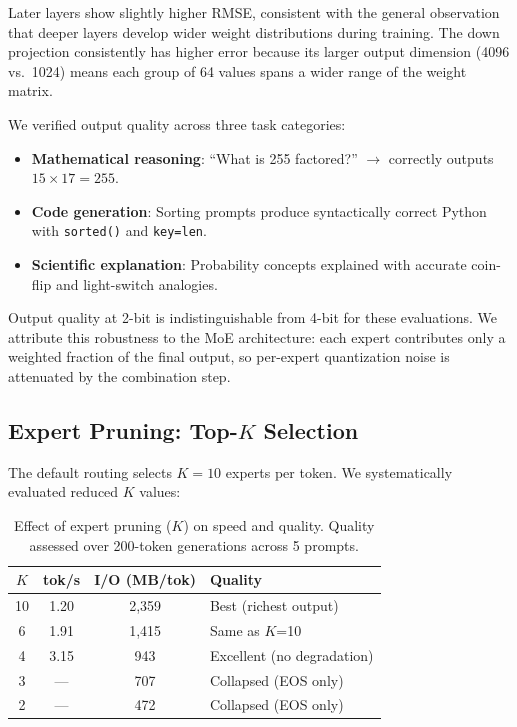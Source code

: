 \documentclass[11pt,twocolumn]{article}
\begin{document}
Later layers show slightly higher RMSE, consistent with the general observation that deeper layers develop wider weight distributions during training.
The down projection consistently has higher error because its larger output dimension (4096 vs.\ 1024) means each group of 64 values spans a wider range of the weight matrix.

We verified output quality across three task categories:
\begin{itemize}[leftmargin=*,itemsep=2pt]
    \item \textbf{Mathematical reasoning}: ``What is 255 factored?'' $\to$ correctly outputs $15 \times 17 = 255$.
    \item \textbf{Code generation}: Sorting prompts produce syntactically correct Python with \texttt{sorted()} and \texttt{key=len}.
    \item \textbf{Scientific explanation}: Probability concepts explained with accurate coin-flip and light-switch analogies.
\end{itemize}

Output quality at 2-bit is indistinguishable from 4-bit for these evaluations.
We attribute this robustness to the MoE architecture: each expert contributes only a weighted fraction of the final output, so per-expert quantization noise is attenuated by the combination step.

\subsection{Expert Pruning: Top-$K$ Selection}

The default routing selects $K=10$ experts per token.
We systematically evaluated reduced $K$ values:

\begin{table}[t]
\centering
\small
\caption{Effect of expert pruning ($K$) on speed and quality. Quality assessed over 200-token generations across 5 prompts.}
\label{tab:pruning}
\begin{tabular}{@{}cccl@{}}
\toprule
$K$ & \textbf{tok/s} & \textbf{I/O (MB/tok)} & \textbf{Quality} \\
\midrule
10 & 1.20 & 2{,}359 & Best (richest output) \\
6 & 1.91 & 1{,}415 & Same as $K$=10 \\
4 & 3.15 & 943 & Excellent (no degradation) \\
3 & --- & 707 & Collapsed (EOS only) \\
2 & --- & 472 & Collapsed (EOS only) \\
\bottomrule
\end{tabular}
\end{table}
\end{document}
